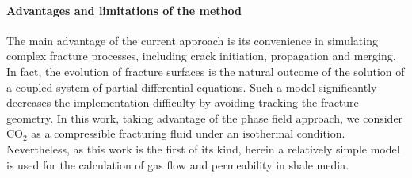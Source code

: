 \paragraph{Advantages and limitations of the method} {The main advantage of the current approach is its convenience in simulating complex fracture processes, including crack initiation, propagation and merging. In fact, the evolution of fracture surfaces is the natural outcome of the solution of a coupled system of partial differential equations. Such a model significantly decreases the implementation difficulty by avoiding tracking the fracture geometry. In this work, taking advantage of the phase field approach, we consider CO$_2$ as a compressible fracturing fluid under an isothermal condition. Nevertheless, as this work is the first of its kind, herein a relatively simple model is used for the calculation of gas flow and permeability in shale media. }